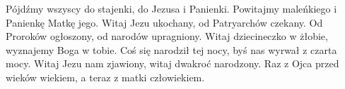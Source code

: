 \beginverse
Pójdźmy wszyscy do stajenki,
do Jezusa i Panienki.
Powitajmy maleńkiego
i Panienkę Matkę jego.
\endverse
\beginverse
Witaj Jezu ukochany,
od Patryarchów czekany.
Od Proroków ogłoszony,
od narodów upragniony.
\endverse
\beginverse
Witaj dziecineczko w żłobie,
wyznajemy Boga w tobie.
Coś się narodził tej nocy,
byś nas wyrwał z czarta mocy.
\endverse
\beginverse
Witaj Jezu nam zjawiony,
witaj dwakroć narodzony.
Raz z Ojca przed wieków wiekiem,
a teraz z matki człowiekiem.
\endverse
\endsong